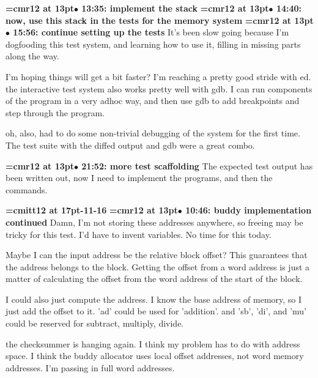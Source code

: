 {\smallskip\noindent\bf\font\titlefont=cmr12 at 13pt\titlefont $\bullet$ 13:35: implement the stack}\smallskip
{\smallskip\noindent\bf\font\titlefont=cmr12 at 13pt\titlefont $\bullet$ 14:40: now, use this stack in the tests for the memory system}\smallskip
{\smallskip\noindent\bf\font\titlefont=cmr12 at 13pt\titlefont $\bullet$ 15:56: continue setting up the tests}\smallskip
It's been slow going because I'm dogfooding this test system, and learning how to use it, filling in missing parts along the way.
\par

I'm hoping things will get a bit faster? I'm reaching a pretty good stride with ed. the interactive test system also works pretty well with gdb. I can run components of the program in a very adhoc way, and then use gdb to add breakpoints and step through the program.
\par

oh, also, had to do some non-trivial debugging of the system for the first time. The test suite with the diffed output and gdb were a great combo.
\par

{\smallskip\noindent\bf\font\titlefont=cmr12 at 13pt\titlefont $\bullet$ 21:52: more test scaffolding}\smallskip
The expected test output has been written out, now I need to implement the programs, and then the commands.
\par

{\medskip\noindent\bf\font\titlefont=cmitt12 at 17pt-11-16}\medskip
{\smallskip\noindent\bf\font\titlefont=cmr12 at 13pt\titlefont $\bullet$ 10:46: buddy implementation continued}\smallskip
Damn, I'm not storing these addresses anywhere, so freeing may be tricky for this test. I'd have to invent variables. No time for this today.
\par

Maybe I can the input address be the relative block offset? This guarantees that the address belongs to the block. Getting the offset from a word address is just a matter of calculating the offset from the word address of the start of the block.
\par

I could also just compute the address. I know the base address of memory, so I just add the offset to it. 'ad' could be used for 'addition'. and 'sb', 'di', and 'mu' could be reserved for subtract, multiply, divide.
\par

the checksummer is hanging again. I think my problem has to do with address space. I think the buddy allocator uses local offset addresses, not word memory addresses. I'm passing in full word addresses.
\par

